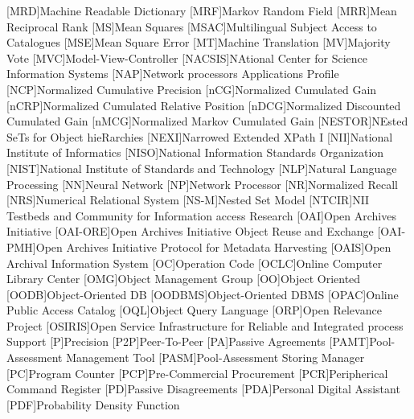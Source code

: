 [MRD]{Machine Readable Dictionary}
[MRF]{Markov Random Field}
[MRR]{Mean Reciprocal Rank}
[MS]{Mean Squares}
[MSAC]{Multilingual Subject Access to Catalogues}
[MSE]{Mean Square Error}
[MT]{Machine Translation}
[MV]{Majority Vote}
[MVC]{Model-View-Controller}
[NACSIS]{NAtional Center for Science Information Systems}
[NAP]{Network processors Applications Profile}
[NCP]{Normalized Cumulative Precision}
[nCG]{Normalized Cumulated Gain}
[nCRP]{Normalized Cumulated Relative Position}
[nDCG]{Normalized Discounted Cumulated Gain}
[nMCG]{Normalized Markov Cumulated Gain}
[NESTOR]{NEsted SeTs for Object hieRarchies}
[NEXI]{Narrowed Extended XPath I}
[NII]{National Institute of Informatics}
[NISO]{National Information Standards Organization}
[NIST]{National Institute of Standards and Technology}
[NLP]{Natural Language Processing}
[NN]{Neural Network}
[NP]{Network Processor}
[NR]{Normalized Recall}
[NRS]{Numerical Relational System}
[NS-M]{Nested Set Model}
[NTCIR]{NII Testbeds and Community for Information access Research}
[OAI]{Open Archives Initiative}
[OAI-ORE]{Open Archives Initiative Object Reuse and Exchange}
[OAI-PMH]{Open Archives Initiative Protocol for Metadata Harvesting}
[OAIS]{Open Archival Information System}
[OC]{Operation Code}
[OCLC]{Online Computer Library Center}
[OMG]{Object Management Group}
[OO]{Object Oriented}
[OODB]{Object-Oriented \acs{DB}}
[OODBMS]{Object-Oriented \acs{DBMS}}
[OPAC]{Online Public Access Catalog}
[OQL]{Object Query Language}
[ORP]{Open Relevance Project}
[OSIRIS]{Open Service Infrastructure for Reliable and Integrated process Support}
[P]{Precision}
[P2P]{Peer-To-Peer}
[PA]{Passive Agreements}
[PAMT]{Pool-Assessment Management Tool}
[PASM]{Pool-Assessment Storing Manager}
[PC]{Program Counter}
[PCP]{Pre-Commercial Procurement}
[PCR]{Peripherical Command Register}
[PD]{Passive Disagreements}
[PDA]{Personal Digital Assistant}
[PDF]{Probability Density Function}
